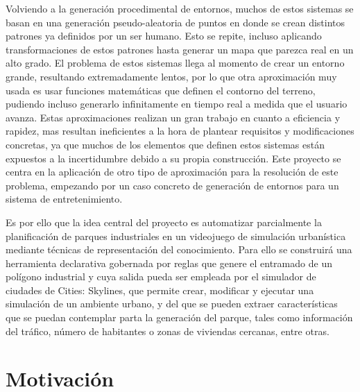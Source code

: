 Volviendo a la generación procedimental de entornos, muchos de estos sistemas se basan en una generación pseudo-aleatoria de puntos en donde se crean distintos patrones ya definidos por un ser humano. Esto se repite, incluso aplicando transformaciones de estos patrones hasta generar un mapa que parezca real en un alto grado. El problema de estos sistemas llega al momento de crear un entorno grande, resultando extremadamente lentos, por lo que otra aproximación muy usada es usar funciones matemáticas que definen el contorno del terreno, pudiendo incluso generarlo infinitamente en tiempo real a medida que el usuario avanza. Estas aproximaciones realizan un gran trabajo en cuanto a eficiencia y rapidez, mas resultan ineficientes a la hora de plantear requisitos y modificaciones concretas, ya que muchos de los elementos que definen estos sistemas están expuestos a la incertidumbre debido a su propia construcción. Este proyecto se centra en la aplicación de otro tipo de aproximación para la resolución de este problema, empezando por un caso concreto de generación de entornos para un sistema de entretenimiento.

Es por ello que la idea central del proyecto es automatizar parcialmente la planificación de parques industriales en un videojuego de simulación urbanística mediante técnicas de representación del conocimiento. Para ello se construirá una herramienta declarativa gobernada por reglas que genere el entramado de un polígono industrial y cuya salida pueda ser empleada por el simulador de ciudades de Cities: Skylines\textcopyright, que permite crear, modificar y ejecutar una simulación de un ambiente urbano, y del que se pueden extraer características que se puedan contemplar parta la generación del parque, tales como información del tráfico, número de habitantes o zonas de viviendas cercanas, entre otras.

\section{Motivación}


